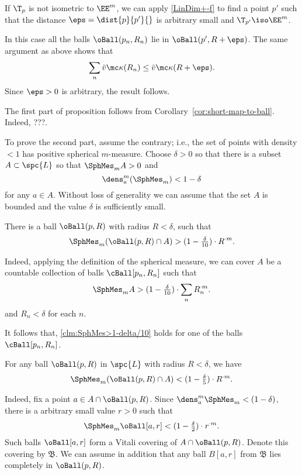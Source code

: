 If $\T_p$ is not isometric to $\EE^m$,
we can apply \ref{LinDim+-f} to find a point $p'$
such that the distance $\eps=\dist{p}{p'}{}$ is arbitrary small and $\T_{p'}\iso\EE^m$.

In this case all the balls $\oBall(p_n,R_n)$ lie in
$\oBall(p',R+\eps)$.
The same argument as above shows that 
\[\sum_n \tilde v\mc\kappa(R_n)\le \tilde v\mc\kappa(R+\eps).\]
Since $\eps>0$ is arbitrary, the result follows.
\qeds


The first part of proposition follows from Corollary~\ref{cor:short-map-to-ball}.
Indeed, ???.

To prove the second part, assume the contrary;
i.e., the set of points with density $<1$ 
has positive spherical $m$-measure.
Choose  $\delta>0$
so that there is a subset $A\subset\spc{L}$ 
so that $\SphMes_m A>0$ 
and 
\[\dens^m_a(\SphMes_m)<1-\delta\] 
for any $a\in A$.
Without loss of generality we can assume that 
the set $A$ is bounded and
the value $\delta$ is sufficiently small.

\begin{clm}{}\label{clm:SphMes>1-delta/10}
There is a ball $\oBall(p,R)$ with radius $R<\delta$,
such that
\[\SphMes_m(\oBall(p,R)\cap A)>(1-\tfrac{\delta}{10})\cdot R^{\cdot m}.\]

\end{clm}

Indeed, applying the definition of the spherical measure, 
we can cover $A$ be a countable collection of balls $\cBall[p_n,R_n]$ such that
\[\SphMes_m A>(1-\tfrac{\delta}{10})\cdot\sum_n R_n^{\cdot m}.\]
and $R_n<\delta$ for each $n$.

It follows that,
\ref{clm:SphMes>1-delta/10} holds 
for one of the balls $\cBall[p_n,R_n]$.
\claimqeds

\begin{clm}{}\label{clm:SphMes<1-delta/2}
For any ball $\oBall(p,R)$ in $\spc{L}$ with radius $R<\delta$, we have
\[\SphMes_m(\oBall(p,R)\cap A)<(1-\tfrac{\delta}{5})\cdot R^{\cdot m}.\]

\end{clm}

Indeed, fix a point $a\in A\cap \oBall(p,R)$.
Since $\dens_a^m\SphMes_m<(1-\delta)$,
there is a arbitrary small value 
$r>0$ such that 
\[\SphMes_m\oBall[a,r]<(1-\tfrac\delta2)\cdot r^{\cdot m}.\]
Such balls $\oBall[a,r]$ form a Vitali covering of $A\cap \oBall(p,R)$.
Denote this covering by $\mathfrak B$.
We can assume in addition that any ball $B[a,r]$ from $\mathfrak B$ lies completely in $\oBall(p,R)$.


